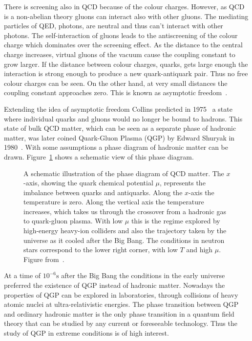 There is screening also in QCD because of the colour charges. However, as QCD is a non-abelian theory gluons can interact also with other gluons. The mediating particles of QED, photons, are neutral and thus can't interact with other photons. The self-interaction of gluons leads to the antiscreening of the colour charge which dominates over the screening effect. As the distance to the central charge increases, virtual gluons of the vacuum cause the coupling constant to grow larger. If the distance between colour charges, quarks, gets large enough the interaction is strong enough to produce a new quark-antiquark pair. Thus no free colour charges can be seen. On the other hand, at very small distances the coupling constant approaches zero. This is known as asymptotic freedom~\cite{Perkins:1982xb}.


Extending the idea of asymptotic freedom Collins predicted in 1975~\cite{Collins:1975} a state where individual quarks and gluons would no longer be bound to hadrons. This state of bulk QCD matter, which can be seen as a separate phase of hadronic matter, was later coined Quark-Gluon Plasma (QGP) by Edward Shuryak in 1980~\cite{Shuryak:1980}. With some assumptions a phase diagram of hadronic matter can be drawn. Figure~\ref{fig:QCDphase} shows a schematic view of this phase diagram.

\begin{figure}[htb]
\centering

\caption[QCD phase diagram]{A schematic illustration of the phase diagram of QCD matter. The $x$-axis, showing the quark chemical potential $\mu$, represents the imbalance between quarks and antiquarks. Along the $x$-axis the temperature is zero. Along the vertical axis the temperature increases, which takes us through the crossover from a hadronic gas to quark-gluon plasma. With low $\mu$ this is the regime explored by high-energy heavy-ion colliders and also the trajectory taken by the universe as it cooled after the Big Bang. The conditions in neutron stars correspond to the lower right corner, with low $T$ and high $\mu$. Figure from~\cite{Rajagopal:2001}.} 
\label{fig:QCDphase}
\end{figure}


At a time of $10^{-6}\mathrm{s}$ after the Big Bang the conditions in the early universe preferred the existence of QGP instead of hadronic matter. Nowadays the properties of QGP can be explored in laboratories, through collisions of heavy atomic nuclei at ultra-relativistic energies. The phase transition between QGP and ordinary hadronic matter is the only phase transition in a quantum field theory that can be studied by any current or foreseeable technology. Thus the study of QGP in extreme conditions is of high interest.

